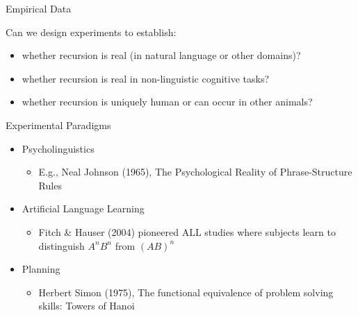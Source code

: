 \documentclass[xcolor=table]{beamer}
\begin{document}
\begin{frame}{Empirical Data}

Can we design experiments to establish:
\begin{itemize}[<+->]
\item whether recursion is real (in natural language or other domains)?
\item whether recursion is real in non-linguistic cognitive tasks?
\item whether recursion is uniquely human or can occur in other animals?
\end{itemize}
\end{frame}

\begin{frame}{Experimental Paradigms}
  \begin{itemize}[<+->]
  \item Psycholinguistics
    \begin{itemize}
    \item E.g., Neal Johnson (1965), The Psychological Reality of
      Phrase-Structure Rules
    \end{itemize}
  \item Artificial Language Learning
    \begin{itemize}
    \item Fitch \& Hauser (2004) pioneered ALL studies where subjects
       learn to distinguish $A^nB^n$ from $(AB)^n$
    \end{itemize}
  \item Planning
    \begin{itemize}
    \item Herbert Simon (1975), The functional equivalence of problem
      solving skills: Towers of Hanoi
    \end{itemize}
  \end{itemize}
\end{frame}
\end{document}
